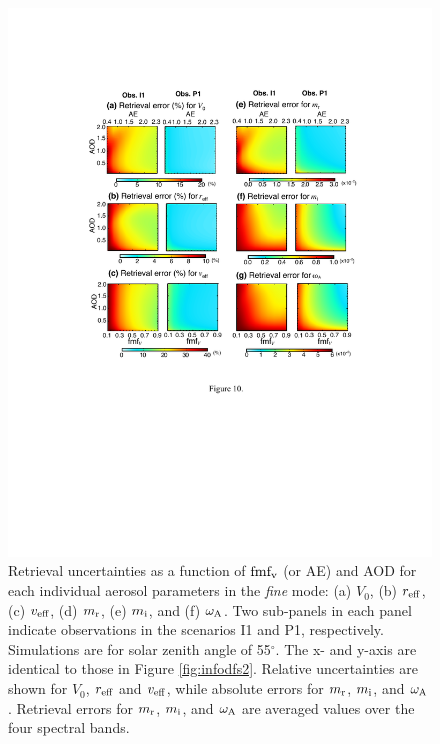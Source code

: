 \begin{figure}[pt]
  \centering
  \includegraphics[width={\textwidth}]{figures/info10.pdf}
  \caption{Retrieval uncertainties as a function of $\text{fmf}_\text{v}$ (or AE) and
AOD for each individual aerosol parameters in the \textit{fine} mode: (a) $V_0$,
(b) $r_\text{eff}$, (c) $v_\text{eff}$, (d) $m_\text{r}$, (e) $m_\text{i}$, and (f) $\omega_\text{A}$.
Two sub-panels in each panel indicate observations in the scenarios 
I1 and P1, respectively. Simulations are for solar zenith angle of
55$^\circ$. The x- and y-axis are identical to those in Figure
\ref{fig:infodfs2}. Relative uncertainties are shown for
$V_0$, $r_\text{eff}$ and $v_\text{eff}$, while absolute errors for $m_\text{r}$, $m_\text{i}$, 
and $\omega_\text{A}$. Retrieval errors for $m_\text{r}$, $m_\text{i}$, 
and $\omega_\text{A}$ are averaged values over the four spectral bands.}
  \label{fig:infoerrf}
\end{figure}

